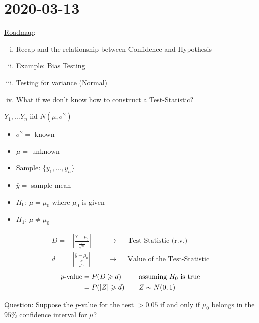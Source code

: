 \section{2020-03-13}
\underline{Roadmap}:
\begin{enumerate}[(i)]
    \item Recap and the relationship between Confidence and Hypothesis
    \item Example: Bias Testing
    \item Testing for variance (Normal)
    \item What if we don't know how to construct a Test-Statistic?
\end{enumerate}

\begin{exbox}
    \begin{example}
        $ Y_1,\ldots Y_n $ iid $ N(\mu,\sigma^2) $
        \begin{itemize}
            \item $ \sigma^2= $ known
            \item $ \mu= $ unknown
            \item Sample: $ \{y_1,\ldots ,y_n\} $
            \item $ \overline{y}= $ sample mean
            \item $ H_0 $: $ \mu=\mu_0 $ where $ \mu_0 $ is given
            \item $ H_1 $: $ \mu \neq \mu_0 $
        \end{itemize}
        \[
            \begin{aligned}
                D= & \left|\frac{\overline{Y}-\mu_0}{\frac{\sigma}{\sqrt{n}}} \right|
                   & \quad                                                            & \rightarrow &  & \text{Test-Statistic (r.v.)}       \\
                d= & \left|\frac{\overline{y}-\mu_0}{\frac{\sigma}{\sqrt{n}}} \right|
                   &                                                                  & \rightarrow &  & \text{Value of the Test-Statistic}
            \end{aligned}
        \]
        \[
            \begin{aligned}
                p\text{-value}
                 & =P(D\geqslant d)   & \quad & \text{assuming }H_0\text{ is true} \\
                 & =P(|Z|\geqslant d) &       & Z \thicksim N(0,1)
            \end{aligned}
        \]
    \end{example}
\end{exbox}
\underline{Question}: Suppose the $ p $-value for the test $ >0.05 $
if and only if $ \mu_0 $ belongs in the $ 95\% $ confidence interval for $ \mu $?

